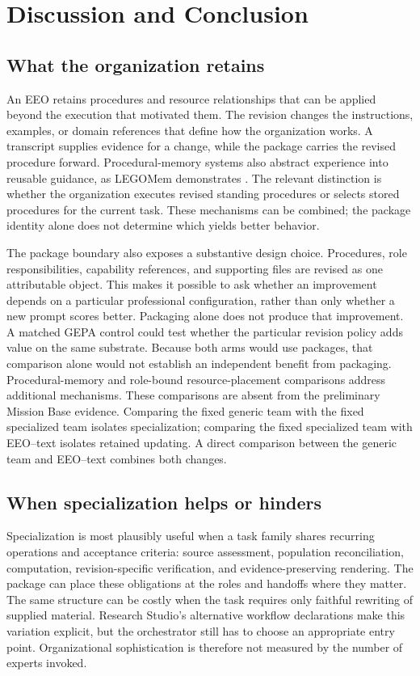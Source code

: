 \section{Discussion and Conclusion}
\subsection{What the organization retains}
An EEO retains procedures and resource relationships that can be applied beyond the execution that motivated them. The revision changes the instructions, examples, or domain references that define how the organization works. A transcript supplies evidence for a change, while the package carries the revised procedure forward. Procedural-memory systems also abstract experience into reusable guidance, as LEGOMem demonstrates \citep{legomem}. The relevant distinction is whether the organization executes revised standing procedures or selects stored procedures for the current task. These mechanisms can be combined; the package identity alone does not determine which yields better behavior.

The package boundary also exposes a substantive design choice. Procedures, role responsibilities, capability references, and supporting files are revised as one attributable object. This makes it possible to ask whether an improvement depends on a particular professional configuration, rather than only whether a new prompt scores better. Packaging alone does not produce that improvement. A matched GEPA control could test whether the particular revision policy adds value on the same substrate. Because both arms would use packages, that comparison alone would not establish an independent benefit from packaging. Procedural-memory and role-bound resource-placement comparisons address additional mechanisms. These comparisons are absent from the preliminary Mission Base evidence. Comparing the fixed generic team with the fixed specialized team isolates specialization; comparing the fixed specialized team with EEO--text isolates retained updating. A direct comparison between the generic team and EEO--text combines both changes.

\subsection{When specialization helps or hinders}
Specialization is most plausibly useful when a task family shares recurring operations and acceptance criteria: source assessment, population reconciliation, computation, revision-specific verification, and evidence-preserving rendering. The package can place these obligations at the roles and handoffs where they matter. The same structure can be costly when the task requires only faithful rewriting of supplied material. Research Studio's alternative workflow declarations make this variation explicit, but the orchestrator still has to choose an appropriate entry point. Organizational sophistication is therefore not measured by the number of experts invoked.

